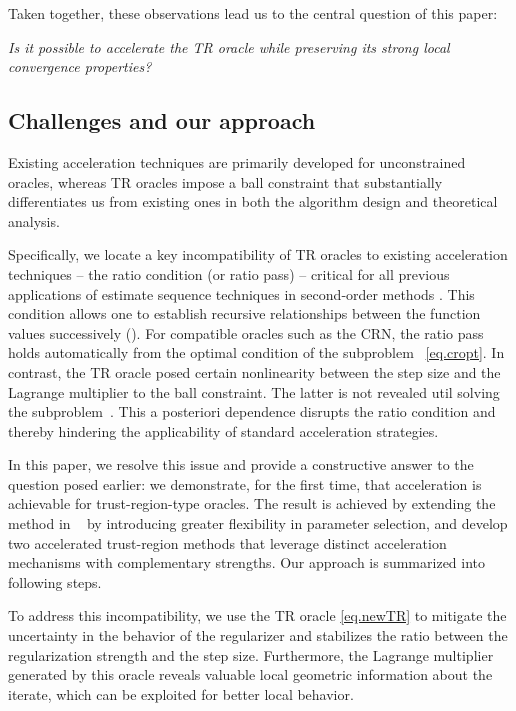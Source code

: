 \documentclass{mcom-l}
\numberwithin{equation}{section}
\begin{document}
Taken together, these observations lead us to the central question of this paper:
\begin{center}
    \emph{Is it possible to accelerate the TR oracle while preserving its strong local convergence properties?}
\end{center}

\subsection{Challenges and our approach}
Existing acceleration techniques are primarily developed for unconstrained oracles, whereas TR oracles impose a ball constraint that substantially differentiates us from existing ones in both the algorithm design and theoretical analysis.

Specifically, we locate a key incompatibility of TR oracles to existing acceleration techniques -- the ratio condition (or ratio pass) -- critical for all previous applications of estimate sequence techniques in second‐order methods \cite{nesterov2008accelerating,monteiro2013accelerated,doikov2020contracting,carmon2022optimal,NEURIPS2022_e56f394b}. This condition allows one to establish recursive relationships between the function values successively ().
For compatible oracles such as the CRN, the ratio pass holds automatically from the optimal condition of the subproblem ~\eqref{eq.cropt}.
In contrast, the TR oracle posed certain nonlinearity between the step size and the Lagrange multiplier to the ball constraint. The latter is not revealed util solving the subproblem~\cite{nocedal1999numerical,cartis2022evaluation}. This a posteriori dependence disrupts the ratio condition and thereby hindering the applicability of standard acceleration strategies.

In this paper, we resolve this issue and provide a constructive answer to the question posed earlier: we demonstrate, for the first time, that acceleration is achievable for trust-region-type oracles. The result is achieved by extending the method in ~\citet{jiang2024nonconvexityuniversaltrustregionmethod} by introducing greater flexibility in parameter selection, and develop two accelerated trust-region methods that leverage distinct acceleration mechanisms with complementary strengths. Our approach is summarized into following steps.

To address this incompatibility, we use the TR oracle \eqref{eq.newTR} to mitigate the uncertainty in the behavior of the regularizer and stabilizes the ratio between the regularization strength and the step size. Furthermore, the Lagrange multiplier generated by this oracle reveals valuable local geometric information about the iterate, which can be exploited for better local behavior.
\end{document}
